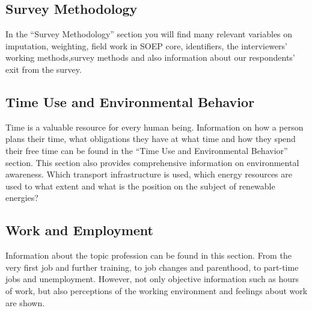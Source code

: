 \documentclass[letterpaper,10pt,openany,onesideH,english]{sphinxmanual}
\begin{document}
\begin{figure}[H]
\centering
{}\end{figure}


\subsection{Survey Methodology}
\label{\detokenize{Contents of SOEPcore/index:survey-methodology}}
In the “Survey Methodology” section you will find many relevant variables on imputation, weighting, field work in SOEP core, identifiers, the interviewers’ working methods,survey methods and also information about our respondents’ exit from the survey.

\subsection{Time Use and Environmental Behavior}
\label{\detokenize{Contents of SOEPcore/index:time-use-and-environmental-behavior}}
Time is a valuable resource for every human being. Information on how a person plans their time, what obligations they have at what time and how they spend their free time can be found in the “Time Use and Environmental Behavior” section. This section also provides comprehensive information on environmental awareness. Which transport infrastructure is used, which energy resources are used to what extent and what is the position on the subject of renewable energies?

\begin{figure}[H]
\centering
{}\end{figure}


\subsection{Work and Employment}
\label{\detokenize{Contents of SOEPcore/index:work-and-employment}}
Information about the topic profession can be found in this section. From the very first job and further training, to job changes and parenthood, to part-time jobs and unemployment. However, not only objective information such as hours of work, but also perceptions of the working environment and feelings about work are shown.
\end{document}
